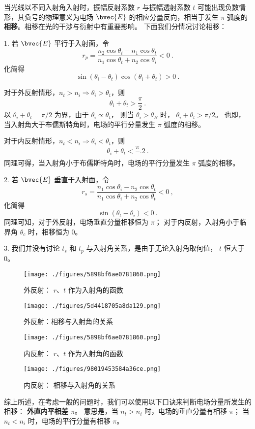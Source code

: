 
\begin{issues}
\issueMissDepend
\end{issues}


当光线以不同入射角入射时，振幅反射系数 $r$ 与振幅透射系数 $t$  可能出现负数情形，其负号的物理意义为电场 $\bvec{E}$ 的相应分量反向，相当于发生 $\pi$ 弧度的\textbf{相移}。相移在光的干涉与衍射中有重要影响。
下面我们分情况讨论相移：

1. 若 $\bvec{E}$ 平行于入射面，令
$$ r_p =  \dfrac{n_2\cos{\theta_i} - n_1\cos\theta_t}{n_1\cos\theta_t + n_2\cos\theta_i} < 0 ~.$$
化简得
$$ \sin(\theta_i - \theta_t)\cos(\theta_i + \theta_t) > 0~.$$

对于外反射情形，$n_t > n_i \Rightarrow \theta_i > \theta_t$，则
$$\theta_i + \theta_t > \frac{\pi}{2}~.$$
以 $\theta_i + \theta_t = \pi/2$ 为界，由于 $\theta_i \propto \theta_t$， 则当 $\theta_i > \theta_B$ 时， $\theta_i + \theta_t > \pi/2$。 也即，当入射角大于布儒斯特角时，电场的平行分量发生 $\pi$ 弧度的相移。

对于内反射情形，$ n_t < n_i \Rightarrow \theta_i < \theta_t$，则
$$\theta_i + \theta_t < \frac{\pi}~.{2}~.$$
同理可得，当入射角小于布儒斯特角时，电场的平行分量发生 $\pi$ 弧度的相移。

2. 若 $\bvec{E}$ 垂直于入射面，令
$$r_s  = \frac{n_1\cos{\theta_i} - n_2\cos\theta_t}{n_1\cos\theta_i + n_2\cos\theta_t} < 0~,$$
化简得
$$\sin(\theta_t - \theta_i) < 0~.$$
同理可知，对于外反射，电场垂直分量相移恒为 $\pi$； 对于内反射，入射角小于临界角 $\theta_c$ 时，相移恒为 0。

3. 我们并没有讨论 $t_s$ 和 $t_p$ 与入射角关系，是由于无论入射角取何值， $ t$ 恒大于0。

\begin{figure}[ht]
\centering
\texttt{[image: ./figures/5898bf6ae0781860.png]}
\caption{外反射： $r$、$t$ 作为入射角的函数} \label{fig_PhaSft_3}
\end{figure}

\begin{figure}[ht]
\centering
\texttt{[image: ./figures/5d4418705a8da129.png]}
\caption{外反射：相移与入射角的关系} \label{fig_PhaSft_4}
\end{figure}

\begin{figure}[ht]
\centering
\texttt{[image: ./figures/5898bf6ae0781860.png]}
\caption{内反射：  $r$、$t$ 作为入射角的函数} \label{fig_PhaSft_1}
\end{figure}

\begin{figure}[ht]
\centering
\texttt{[image: ./figures/98019453584a36ce.png]}
\caption{内反射： 相移与入射角的关系} \label{fig_PhaSft_2}
\end{figure}

综上所述，在考虑一般的问题时，我们可以使用以下口诀来判断电场分量所发生的相移： 
\textbf{外直内平相差 $\pi$}。
意思是，当 $n_t > n_i$ 时，电场的垂直分量有相移 $\pi$； 当 $n_t < n_i$ 时，电场的平行分量有相移 $\pi$。
